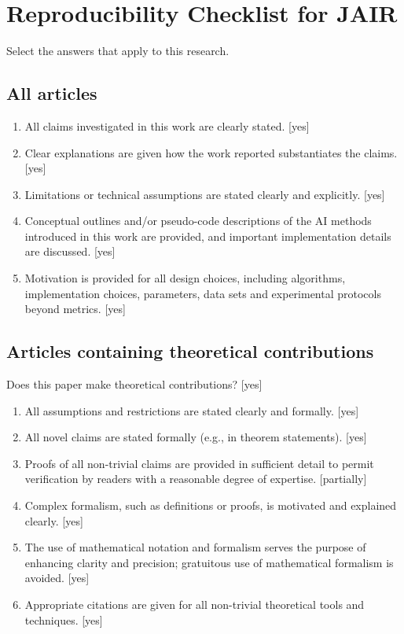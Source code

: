 \documentclass[]{jair}
\begin{document}

\appendix
\section{Reproducibility Checklist for JAIR}

Select the answers that apply to this research.

\subsection*{All articles}
\begin{enumerate}
    \item All claims investigated in this work are clearly stated. [yes]
    \item Clear explanations are given how the work reported substantiates the claims. [yes]
    \item Limitations or technical assumptions are stated clearly and explicitly. [yes]
    \item Conceptual outlines and/or pseudo-code descriptions of the AI methods introduced in this work are provided, and important implementation details are discussed. [yes]
    \item Motivation is provided for all design choices, including algorithms, implementation choices, parameters, data sets and experimental protocols beyond metrics. [yes]
\end{enumerate}

\subsection*{Articles containing theoretical contributions}
Does this paper make theoretical contributions? [yes]
\begin{enumerate}
    \item All assumptions and restrictions are stated clearly and formally. [yes]
    \item All novel claims are stated formally (e.g., in theorem statements). [yes]
    \item Proofs of all non-trivial claims are provided in sufficient detail to permit verification by readers with a reasonable degree of expertise. [partially]
    \item Complex formalism, such as definitions or proofs, is motivated and explained clearly. [yes]
    \item The use of mathematical notation and formalism serves the purpose of enhancing clarity and precision; gratuitous use of mathematical formalism is avoided. [yes]
    \item Appropriate citations are given for all non-trivial theoretical tools and techniques. [yes]
\end{enumerate}
\end{document}
